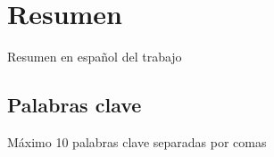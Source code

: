 \chapter*{Resumen}

Resumen en español del trabajo


\section*{Palabras clave}
   
\noindent Máximo 10 palabras clave separadas por comas

   


